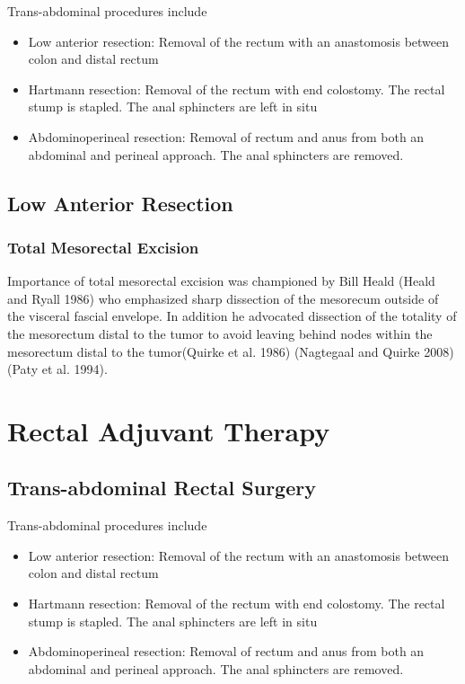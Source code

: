 \documentclass[
  letterpaper,
]{scrbook}
\providecommand{\tightlist}{%
  \setlength{\itemsep}{0pt}\setlength{\parskip}{0pt}}
\begin{document}
Trans-abdominal procedures include

\begin{itemize}
\tightlist
\item
  Low anterior resection: Removal of the rectum with an anastomosis
  between colon and distal rectum
\item
  Hartmann resection: Removal of the rectum with end colostomy. The
  rectal stump is stapled. The anal sphincters are left in situ
\item
  Abdominoperineal resection: Removal of rectum and anus from both an
  abdominal and perineal approach. The anal sphincters are removed.
\end{itemize}

\section{Low Anterior Resection}\label{low-anterior-resection}

\subsection{Total Mesorectal Excision}\label{total-mesorectal-excision}

Importance of total mesorectal excision was championed by Bill Heald
(Heald and Ryall 1986) who emphasized sharp dissection of the mesorecum
outside of the visceral fascial envelope. In addition he advocated
dissection of the totality of the mesorectum distal to the tumor to
avoid leaving behind nodes within the mesorectum distal to the
tumor(Quirke et al. 1986) (Nagtegaal and Quirke 2008) (Paty et al.
1994).

\chapter{Rectal Adjuvant Therapy}\label{RectalAdjuvant}

\section{Trans-abdominal Rectal
Surgery}\label{trans-abdominal-rectal-surgery-1}

Trans-abdominal procedures include

\begin{itemize}
\tightlist
\item
  Low anterior resection: Removal of the rectum with an anastomosis
  between colon and distal rectum
\item
  Hartmann resection: Removal of the rectum with end colostomy. The
  rectal stump is stapled. The anal sphincters are left in situ
\item
  Abdominoperineal resection: Removal of rectum and anus from both an
  abdominal and perineal approach. The anal sphincters are removed.
\end{itemize}
\end{document}
